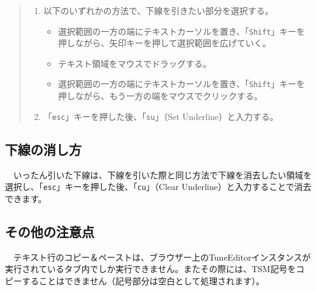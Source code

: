 \begin{quote}
\begin{enumerate}
\item 以下のいずれかの方法で、下線を引きたい部分を選択する。
	\begin{itemize}
	\item 選択範囲の一方の端にテキストカーソルを置き、「\texttt{Shift}」キーを押しながら、矢印キーを押して選択範囲を広げていく。
	\item テキスト領域をマウスでドラッグする。
	\item 選択範囲の一方の端にテキストカーソルを置き、「\texttt{Shift}」キーを押しながら、もう一方の端をマウスでクリックする。
	\end{itemize}
\item 「\texttt{esc}」キーを押した後、「\texttt{su}」（Set Underline）と入力する。
\end{enumerate}
\end{quote}

\subsection{下線の消し方}

　いったん引いた下線は、下線を引いた際と同じ方法で下線を消去したい領域を選択し、「\texttt{esc}」キーを押した後、「\texttt{cu}」（Clear Underline）と入力することで消去できます。

\subsection{その他の注意点}

　テキスト行のコピー＆ペーストは、ブラウザー上のTuneEditorインスタンスが実行されているタブ内でしか実行できません。またその際には、TSM記号をコピーすることはできません（記号部分は空白として処理されます）。
